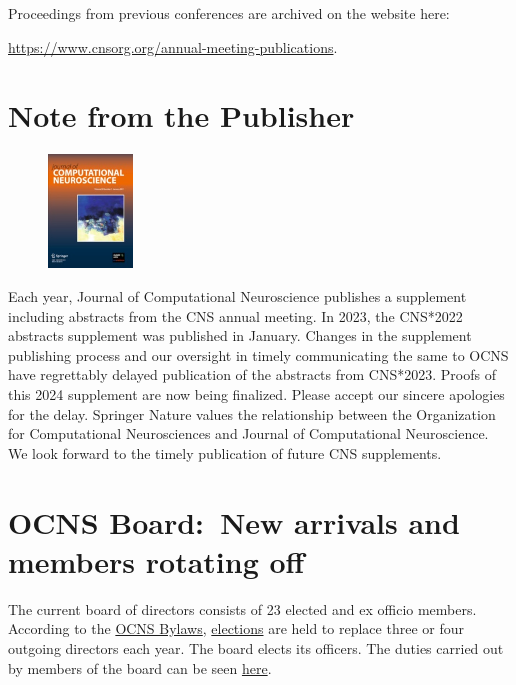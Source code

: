 \documentclass[11pt,a4paper,oneside]{article}
\begin{document}
Proceedings from previous conferences are archived on the website here:

\begin{center}
\url{https://www.cnsorg.org/annual-meeting-publications}.
\end{center}
\vspace{2ex}

\section*{Note from the Publisher}%
\begin{figure}
  \includegraphics[width=0.2\textwidth]{images/jcns2011}
\end{figure}

Each year, Journal of Computational Neuroscience publishes a supplement including abstracts from the CNS annual meeting.
In 2023, the CNS*2022 abstracts supplement was published in January.
Changes in the supplement publishing process and our oversight in timely communicating the same to OCNS have regrettably delayed publication of the abstracts from CNS*2023.
Proofs of this 2024 supplement are now being finalized.
Please accept our sincere apologies for the delay.
Springer Nature values the relationship between the Organization for Computational Neurosciences and Journal of Computational Neuroscience.
We look forward to the timely publication of future CNS supplements.


\clearpage
\section*{OCNS Board:\ New arrivals and members rotating off}%
\sectionauthor{\vspace{-4ex}}

The current board of directors consists of 23 elected and ex officio members.
According to the \href{https://www.cnsorg.org/ocns-bylaws-2011}{OCNS Bylaws}, \href{https://www.cnsorg.org/election-procedures}{elections} are held to replace three or four outgoing directors each year.
The board elects its officers.
The duties carried out by members of the board can be seen \href{https://www.cnsorg.org/quick-director-duties}{here}.
\end{document}

